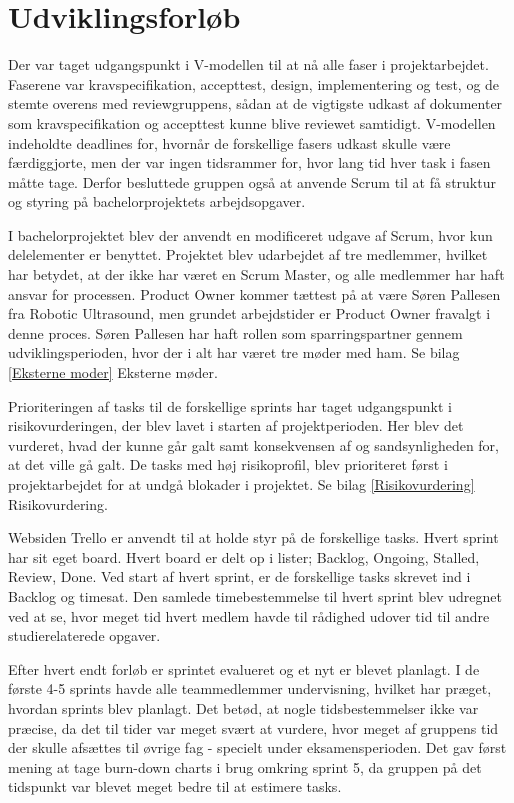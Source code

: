 \section{Udviklingsforløb}
Der var taget udgangspunkt i V-modellen til at nå alle faser i projektarbejdet. Faserene var kravspecifikation, accepttest, design, implementering og test, og de stemte overens med reviewgruppens, sådan at de vigtigste udkast af dokumenter som kravspecifikation og accepttest kunne blive reviewet samtidigt. V-modellen indeholdte deadlines for, hvornår de forskellige fasers udkast skulle være færdiggjorte, men der var ingen tidsrammer for, hvor lang tid hver task i fasen måtte tage. Derfor besluttede gruppen også at anvende Scrum til at få struktur og styring på bachelorprojektets arbejdsopgaver.

I bachelorprojektet blev der anvendt en modificeret udgave af Scrum, hvor kun delelementer er benyttet. Projektet blev udarbejdet af tre medlemmer, hvilket har betydet, at der ikke har været en Scrum Master, og alle medlemmer har haft ansvar for processen. Product Owner kommer tættest på at være Søren Pallesen fra Robotic Ultrasound, men grundet arbejdstider er Product Owner fravalgt i denne proces. Søren Pallesen har haft rollen som sparringspartner gennem udviklingsperioden, hvor der i alt har været tre møder med ham. Se bilag \ref{Eksterne moder} Eksterne møder. 

Prioriteringen af tasks til de forskellige sprints har taget udgangspunkt i risikovurderingen, der blev lavet i starten af projektperioden. Her blev det vurderet, hvad der kunne går galt samt konsekvensen af og sandsynligheden for, at det ville gå galt. De tasks med høj risikoprofil, blev prioriteret først i projektarbejdet for at undgå blokader i projektet. Se bilag \ref{Risikovurdering} Risikovurdering.  

Websiden Trello er anvendt til at holde styr på de forskellige tasks. Hvert sprint har sit eget board. Hvert board er delt op i lister; Backlog, Ongoing, Stalled, Review, Done. Ved start af hvert sprint, er de forskellige tasks skrevet ind i Backlog og timesat. Den samlede timebestemmelse til hvert sprint blev udregnet ved at se, hvor meget tid hvert medlem havde til rådighed udover tid til andre studierelaterede opgaver. 

Efter hvert endt forløb er sprintet evalueret og et nyt er blevet planlagt. I de første 4-5 sprints havde alle teammedlemmer undervisning, hvilket har præget, hvordan sprints blev planlagt. Det betød, at nogle tidsbestemmelser ikke var præcise, da det til tider var meget svært at vurdere, hvor meget af gruppens tid der skulle afsættes til øvrige fag - specielt under eksamensperioden. Det gav først mening at tage burn-down charts i brug omkring sprint 5, da gruppen på det tidspunkt var blevet meget bedre til at estimere tasks.

